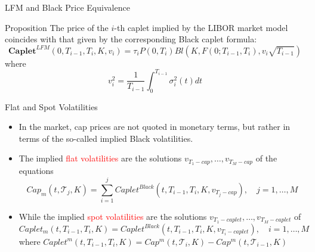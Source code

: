 \documentclass{beamer}
\begin{document}
\begin{frame}{LFM and Black Price Equivalence}
	\begin{block}{Proposition}
		The price of the $i$-th caplet implied by the LIBOR market model coincides with that given by the corresponding Black caplet formula:
		\begin{equation}
			\textbf{Caplet}^{LFM}(0, T_{i-1}, T_i, K, v_i)= \tau_i P(0, T_i) Bl(K, F(0; T_{i-1}, T_i), v_i\sqrt{T_{i-1}})
		\end{equation}
		where
		\begin{equation}
			v_i^2 = \frac{1}{T_{i-1}}\int_0^{T_{i-1}}\sigma_i^2(t)dt
			\label{eq:caplet_black_vol}
		\end{equation}
	\end{block}
\end{frame}

\begin{frame}{Flat and Spot Volatilities}
	\begin{itemize}
		\item<1-> In the market, cap prices are not quoted in monetary terms, but rather in terms of the so-called implied Black volatilities. 
		\item<2-> The implied \textcolor{red}{flat volatilities} are the solutions $v_{T_1-cap},\ldots, v_{T_M-cap}$ of the equations
		\begin{equation*}
			Cap_m(t, \mathcal{T}_j, K) = \sum_{i=1}^j Caplet^{Black}(t, T_{i-1}, T_i,K,v_{T_j-cap}),\quad j=1, \ldots,M
		\end{equation*}
		\item<3-> While the implied \textcolor{red}{spot volatilities} are the solutions $v_{T_1-caplet},\ldots, v_{T_M-caplet}$ of
		\begin{equation*}
			Caplet_m(t, T_{i-1},T_i,K) = Caplet^{Black}(t, T_{i-1}, T_i,K,v_{T_i-caplet}),\quad i=1, \ldots,M
		\end{equation*} 
		where $Caplet^m(t, T_{i-1}, T_i, K) = Cap^m(t, \mathcal{T}_i,K)-Cap^m(t, \mathcal{T}_{i-1},K)$
	\end{itemize}
\end{frame}
\end{document}
